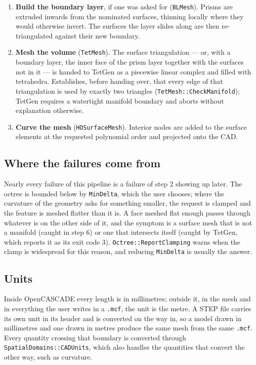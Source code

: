 {\begin{enumerate}
\item \textbf{Build the boundary layer}, if one was asked for
  (\texttt{BLMesh}). Prisms are extruded inwards from the nominated surfaces,
  thinning locally where they would otherwise invert. The surfaces the layer
  slides along are then re-triangulated against their new boundary.

\item \textbf{Mesh the volume} (\texttt{TetMesh}). The surface triangulation
  --- or, with a boundary layer, the inner face of the prism layer together
  with the surfaces not in it --- is handed to TetGen as a piecewise linear
  complex and filled with tetrahedra. Establishes, before handing over, that
  every edge of that triangulation is used by exactly two triangles
  (\texttt{TetMesh::CheckManifold}); TetGen requires a watertight manifold
  boundary and aborts without explanation otherwise.

\item \textbf{Curve the mesh} (\texttt{HOSurfaceMesh}). Interior nodes are
  added to the surface elements at the requested polynomial order and
  projected onto the CAD.
\end{enumerate}

\subsection{Where the failures come from}

Nearly every failure of this pipeline is a failure of step 2 showing up
later. The octree is bounded below by \texttt{MinDelta}, which the user
chooses; where the curvature of the geometry asks for something smaller, the
request is clamped and the feature is meshed flatter than it is. A face
meshed flat enough passes through whatever is on the other side of it, and
the symptom is a surface mesh that is not a manifold (caught in step 6) or
one that intersects itself (caught by TetGen, which reports it as its exit
code 3). \texttt{Octree::ReportClamping} warns when the clamp is widespread
for this reason, and reducing \texttt{MinDelta} is usually the answer.

\subsection{Units}

Inside OpenCASCADE every length is in millimetres; outside it, in the mesh
and in everything the user writes in a \texttt{.mcf}, the unit is the metre.
A STEP file carries its own unit in its header and is converted on the way
in, so a model drawn in millimetres and one drawn in metres produce the same
mesh from the same \texttt{.mcf}. Every quantity crossing that boundary is
converted through \texttt{SpatialDomains::CADUnits}, which also handles the
quantities that convert the other way, such as curvature.

}
